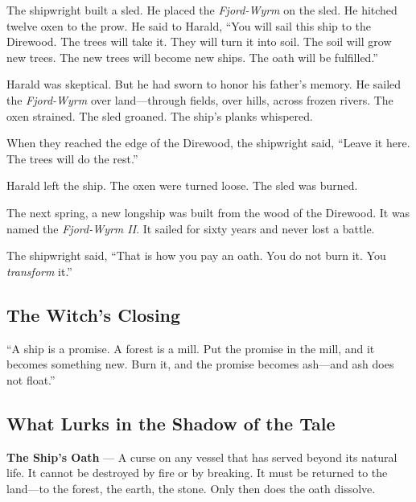 \documentclass[9pt,a5paper]{extbook}
\begin{document}
The shipwright built a sled. He placed the \textit{Fjord-Wyrm} on the sled. He hitched twelve oxen to the prow. He said to Harald, ``You will sail this ship to the Direwood. The trees will take it. They will turn it into soil. The soil will grow new trees. The new trees will become new ships. The oath will be fulfilled.''

Harald was skeptical. But he had sworn to honor his father's memory. He sailed the \textit{Fjord-Wyrm} over land---through fields, over hills, across frozen rivers. The oxen strained. The sled groaned. The ship's planks whispered.

When they reached the edge of the Direwood, the shipwright said, ``Leave it here. The trees will do the rest.''

Harald left the ship. The oxen were turned loose. The sled was burned.

The next spring, a new longship was built from the wood of the Direwood. It was named the \textit{Fjord-Wyrm II}. It sailed for sixty years and never lost a battle.

The shipwright said, ``That is how you pay an oath. You do not burn it. You \textit{transform} it.''

\subsection*{The Witch's Closing}

``A ship is a promise. A forest is a mill. Put the promise in the mill, and it becomes something new. Burn it, and the promise becomes ash---and ash does not float.''

\subsection*{What Lurks in the Shadow of the Tale}

\textbf{The Ship's Oath} --- A curse on any vessel that has served beyond its natural life. It cannot be destroyed by fire or by breaking. It must be returned to the land---to the forest, the earth, the stone. Only then does the oath dissolve.
\end{document}
